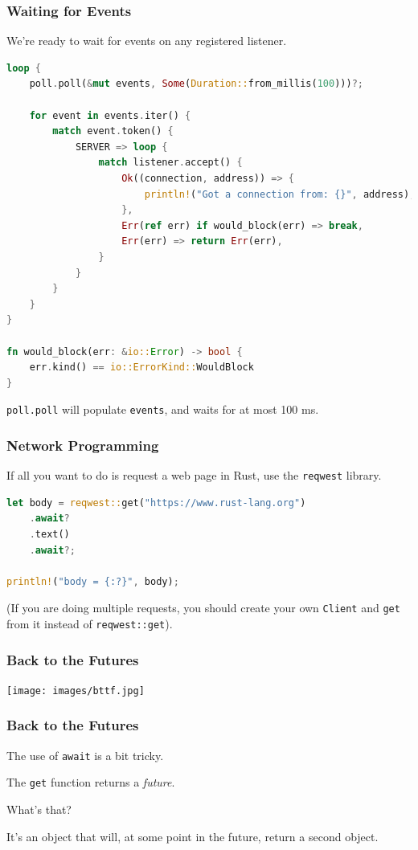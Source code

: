 \begin{frame}[fragile]
\frametitle{Waiting for Events}

We're ready to wait for events on any registered listener.
    \begin{lstlisting}[language=Rust]
loop {
    poll.poll(&mut events, Some(Duration::from_millis(100)))?;

    for event in events.iter() {
        match event.token() {
            SERVER => loop {
                match listener.accept() {
                    Ok((connection, address)) => {
                        println!("Got a connection from: {}", address);
                    },
                    Err(ref err) if would_block(err) => break,
                    Err(err) => return Err(err),
                }
            }
        }
    }
}

fn would_block(err: &io::Error) -> bool {
    err.kind() == io::ErrorKind::WouldBlock
}    \end{lstlisting}

\texttt{poll.poll} will populate \texttt{events}, and
waits for at most 100 ms.

\end{frame}


\begin{frame}[fragile]
\frametitle{Network Programming}
If all you want to do is request a web page in Rust, use
the \texttt{reqwest} library.

\begin{lstlisting}[language=Rust]
let body = reqwest::get("https://www.rust-lang.org")
    .await?
    .text()
    .await?;

println!("body = {:?}", body);
\end{lstlisting}

(If you are doing multiple requests,
you should create your own \texttt{Client} and \texttt{get} from it instead of
\texttt{reqwest::get}).

\end{frame}


\begin{frame}
\frametitle{Back to the Futures}

\begin{center}
	\texttt{[image: images/bttf.jpg]}
\end{center}

\end{frame}

\begin{frame}
\frametitle{Back to the Futures}

The use of \texttt{await} is a bit tricky.

The \texttt{get} function returns a \emph{future}. 

What's that?  

It's
an object that will, at some point in the future, return a second
object.

\end{frame}


